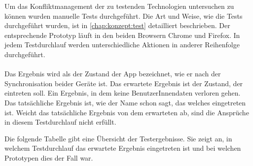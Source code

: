 Um das Konfliktmanagement der zu testenden Technologien untersuchen zu können wurden manuelle Tests durchgeführt.
Die Art und Weise, wie die Tests durchgeführt wurden, ist in \autoref{chap:konzept:test} detailliert beschrieben.
Der entsprechende Prototyp läuft in den beiden Browsern Chrome und Firefox. In jedem Testdurchlauf werden unterschiedliche Aktionen in anderer Reihenfolge durchgeführt.\\\\
%
%
Das Ergebnis wird als der Zustand der \gls{App} bezeichnet, wie er nach der Synchronisation beider Geräte ist.
Das erwartete Ergebnis ist der Zustand, der eintreten soll. Ein Ergebnis, in dem keine BenutzerInnendaten verloren gehen.\\
Das tatsächliche Ergebnis ist, wie der Name schon sagt, das welches eingetreten ist.
Weicht das tatsächliche Ergebnis von dem erwarteten ab, sind die Ansprüche in diesem Testdurchlauf nicht erfüllt. 
% 
% 

%
%

%
%
%

% 
% 
% 
% 
Die folgende Tabelle gibt eine Übersicht der Testergebnisse.
Sie zeigt an, in welchem Testdurchlauf das erwartete Ergebnis eingetreten ist und bei welchen Prototypen dies der Fall war.

